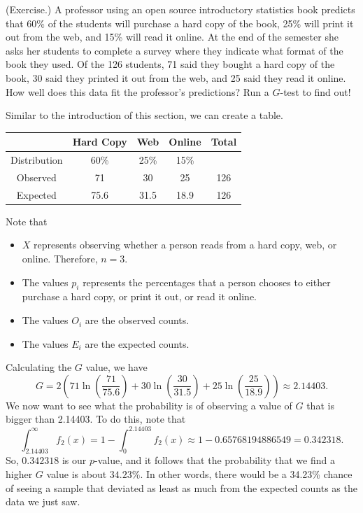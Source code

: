 \documentclass[letterpaper]{article}
\begin{document}
\begin{mdframed}
    (Exercise.) A professor using an open source introductory statistics book predicts that 60\% of the students will purchase a hard copy of the book, 25\% will print it out from the web, and 15\% will read it online. At the end of the semester she asks her students to complete a survey where they indicate what format of the book they used. Of the 126 students, 71 said they bought a hard copy of the book, 30 said they printed it out from the web, and 25 said they read it online. How well does this data fit the professor's predictions? Run a $G$-test to find out!

    \begin{mdframed}
        Similar to the introduction of this section, we can create a table. 
        \begin{center}
            \begin{tabular}{c|c c c c}
                    & Hard Copy & Web & Online & Total \\
                \hline  
                Distribution & 60\% & 25\% & 15\% \\ 
                Observed & 71 & 30 & 25 & 126 \\ 
                Expected & 75.6 & 31.5 & 18.9 & 126
            \end{tabular}
        \end{center}
        Note that 
        \begin{itemize}
            \item $X$ represents observing whether a person reads from a hard copy, web, or online. Therefore, $n = 3$.
            \item The values $p_i$ represents the percentages that a person chooses to either purchase a hard copy, or print it out, or read it online.
            \item The values $O_i$ are the observed counts. 
            \item The values $E_i$ are the expected counts. 
        \end{itemize}
        
        Calculating the $G$ value, we have 
        \[G = 2\left(71\ln\left(\frac{71}{75.6}\right) + 30\ln\left(\frac{30}{31.5}\right) + 25\ln\left(\frac{25}{18.9}\right)\right) \approx 2.14403.\]
        We now want to see what the probability is of observing a value of $G$ that is bigger than 2.14403. To do this, note that 
        \[\int_{2.14403}^{\infty} f_{2}(x) = 1 - \int_{0}^{2.14403} f_{2}(x) \approx 1 - 0.65768194886549 = 0.342318.\]
        So, $0.342318$ is our $p$-value, and it follows that the probability that we find a higher $G$ value is about $34.23\%$. In other words, there would be a 34.23\% chance of seeing a sample that deviated as least as much from the expected counts as the data we just saw. 
    \end{mdframed}
\end{mdframed}
\end{document}
